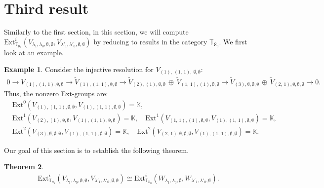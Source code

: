 \documentclass[openany, a4paper]{amsbook}
\newtheorem{thm}{Theorem}[chapter]
\theoremstyle{definition}
\newtheorem{exmp}[thm]{Example}
\numberwithin{equation}{chapter}
\newcommand{\T}[1]{{\mathbb{T}}_{\aleph_{#1}}}
\newcommand{\Ext}[4]{\mathrm{Ext}^{#1}_{#2}({#3}, {#4})}
\begin{document}
\section{Third result}

Similarly to the first section, in this section, we will compute $\Ext{i}{\T{1}}{V_{\lambda_1, \lambda_0, \emptyset, \emptyset}}{V_{\lambda'_1, \lambda'_0, \emptyset, \emptyset}}$ by reducing to results in the category $\T{0}$. We first look at an example. 

\begin{exmp}\label{third res ex 1}
    Consider the injective resolution for $V_{ (1), \ (1,\,1), \ \emptyset, \emptyset }$:
    \begin{align*}
        0 \to 
        V_{ (1), (1,\,1), \emptyset, \emptyset }\to
        \tilde{V}_{ (1), (1,\,1), \emptyset, \emptyset }
        \to
        \tilde{V}_{ (2), (1), \emptyset, \emptyset }\,\oplus\,\tilde{V}_{ (1,\,1), (1), \emptyset, \emptyset }
        \to
        \tilde{V}_{ (3), \emptyset, \emptyset, \emptyset }\,\oplus\,\tilde{V}_{ (2,\,1), \emptyset, \emptyset, \emptyset }  
        \to 0. 
    \end{align*}
    Thus, the nonzero Ext-groups are:
    \begin{align*}
        &\Ext{0}{}{V_{ (1), (1,\,1), \emptyset, \emptyset}}{V_{ (1), (1,\,1), \emptyset, \emptyset }} = \mathbb{K}, \\
        &\Ext{1}{}{V_{(2), (1), \emptyset, \emptyset }}{V_{ (1), (1,\,1), \emptyset, \emptyset }} = \mathbb{K}, 
        \quad  
        \Ext{1}{}{V_{(1,\,1), (1), \emptyset, \emptyset}}{V_{ (1), (1,\,1), \emptyset, \emptyset }} = \mathbb{K},\\
        &\Ext{2}{}{V_{(3), \emptyset, \emptyset, \emptyset }}{V_{ (1), (1,\,1), \emptyset, \emptyset }} = \mathbb{K}, 
        \quad 
        \Ext{2}{}{V_{(2,\,1), \emptyset, \emptyset, \emptyset }}{V_{ (1), (1,\,1), \emptyset,\emptyset }} = \mathbb{K}.
    \end{align*}
\end{exmp}

Our goal of this section is to establish the following theorem.

\begin{thm}\label{result3}
    \begin{align}
        \Ext{i}{\T{1}}{V_{\lambda_1, \lambda_0, \emptyset, \emptyset}}{V_{\lambda'_1, \lambda'_0, \emptyset, \emptyset}} \cong
        \Ext{i}{\T{0}}{W_{\lambda_1, \lambda_0, \emptyset}}{W_{\lambda'_1, \lambda'_0, \emptyset}}.
    \end{align}
\end{thm}
\end{document}
